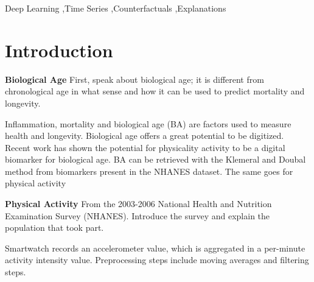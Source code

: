 \documentclass[5p,times]{elsarticle}
\begin{document}
\begin{frontmatter}
\begin{abstract}

\end{abstract}



\begin{keyword}
Deep Learning \sep Time Series \sep Counterfactuals \sep Explanations%
\end{keyword}

\end{frontmatter}



\section{Introduction}
\label{sec:sample1}
\textbf{Biological Age} First, speak about biological age; it is different from chronological age in what sense and how it can be used to predict mortality and longevity. 

Inflammation, mortality and biological age (BA) are factors used to measure health and longevity. Biological age offers a great potential to be digitized. Recent work has shown the potential for physicality activity to be a digital biomarker for biological age. BA can be retrieved with the Klemeral and Doubal method from biomarkers present in the NHANES dataset. The same goes for physical activity

\textbf{Physical Activity} From the 2003-2006 National Health and Nutrition Examination Survey (NHANES). Introduce the survey and explain the population that took part.

Smartwatch records an accelerometer value, which is aggregated in a per-minute activity intensity value. Preprocessing steps include moving averages and filtering steps.
\end{document}
